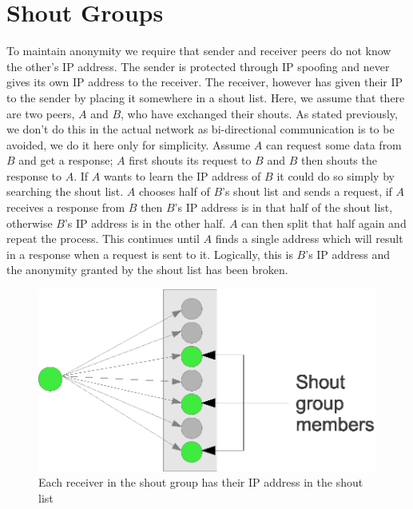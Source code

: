 \documentclass[ %
                    author={Luke Murray},
                supervisor={Dr. Simon Hollis},
                     title={Shadow Peer-to-Peer Networks},
                  subtitle={},
                    degree={MEng},
                      year={2013} ]{thesis}
\begin{document}
\section{Shout Groups}
\label{sec:shout_groups}

To maintain anonymity we require that sender and receiver peers do not know the other's IP address. The sender is protected through IP spoofing and never gives its own IP address to the receiver. The receiver, however has given their IP to the sender by placing it somewhere in a shout list. Here, we assume that there are two peers, $A$ and $B$, who have exchanged their shouts. As stated previously, we don't do this in the actual network as bi-directional communication is to be avoided, we do it here only for simplicity. Assume $A$ can request some data from $B$ and get a response; $A$ first shouts its request to $B$ and $B$ then shouts the response to $A$. If $A$ wants to learn the IP address of $B$ it could do so simply by searching the shout list. $A$ chooses half of $B$'s shout list and sends a request, if $A$ receives a response from $B$ then $B$'s IP address is in that half of the shout list, otherwise $B$'s IP address is in the other half. $A$ can then split that half again and repeat the process. This continues until $A$ finds a single address which will result in a response when a request is sent to it. Logically, this is $B$'s IP address and the anonymity granted by the shout list has been broken.

\begin{figure}[h]
    \centering
    \includegraphics{diagrams/shout_group_def.eps}
    \caption{Each receiver in the shout group has their IP address in the shout list}
    \label{shoutgroupdef}
\end{figure}
\end{document}

